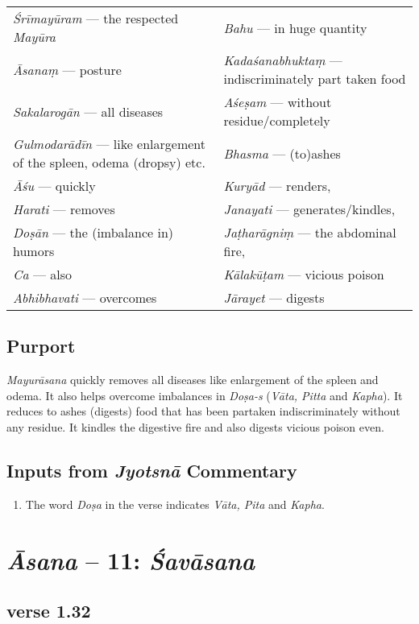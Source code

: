 \begin{longtable}{>{\noindent\raggedright}p{5cm}>{\noindent\raggedright}p{5cm}}
\textit{Śrīmayūram} --- the respected \textit{Mayūra}  & \textit{Bahu} --- in huge quantity\tabularnewline
\textit{Āsanaṃ} --- posture  & \textit{Kadaśanabhuktaṃ} --- indiscriminately part taken food\tabularnewline
\textit{Sakalarogān} --- all diseases   & \textit{Aśeṣam} --- without residue/completely\tabularnewline
\textit{Gulmodarādīn} --- like enlargement of the spleen, odema (dropsy) etc. &  \textit{Bhasma} --- (to)ashes  \tabularnewline
\textit{Āśu} --- quickly  & \textit{Kuryād} --- renders, \tabularnewline
\textit{Harati} --- removes & \textit{Janayati} --- generates/kindles,\tabularnewline
\textit{Doṣān} --- the (imbalance in) humors  & \textit{Jaṭharāgniṃ} --- the abdominal fire,\tabularnewline
\textit{Ca} --- also & \textit{Kālakūṭam} --- vicious poison \tabularnewline
\textit{Abhibhavati} --- overcomes   & \textit{Jārayet} --- digests
\end{longtable}

\subsection*{Purport}

\textit{Mayurāsana} quickly removes all diseases like enlargement of the spleen and odema. It also helps overcome imbalances in \textit{Doṣa-s} (\textit{Vāta, Pitta} and \textit{Kapha}). It reduces to ashes (digests) food that has been partaken indiscriminately without any residue. It kindles the digestive fire and also digests vicious poison even. 

\subsection*{Inputs from \textit{Jyotsnā} Commentary}

\begin{enumerate}
\item The word \textit{Doṣa} in the verse indicates \textit{Vāta, Pita} and \textit{Kapha}.
\end{enumerate}


\section*{\textit{Āsana} -- 11: \textit{Śavāsana}}

\subsection*{verse 1.32}

